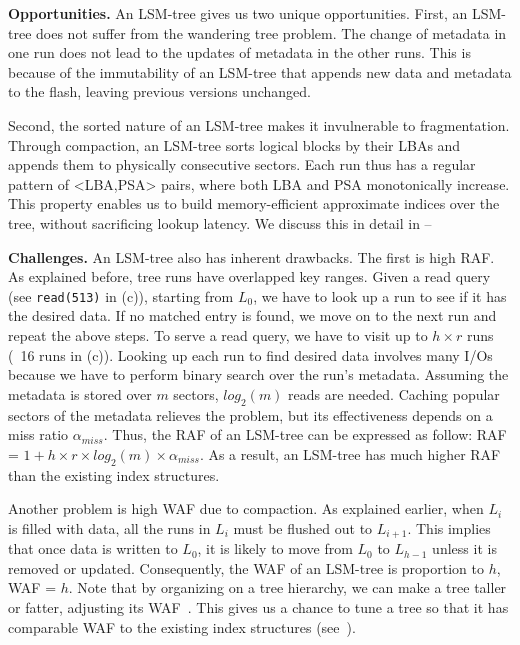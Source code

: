 \textbf{Opportunities.}
An LSM-tree gives us two unique opportunities.
First, an LSM-tree does not suffer from the wandering tree problem.
The change of metadata in one run does not lead 
to the updates of metadata in the other runs.
This is because of the immutability of an LSM-tree that
appends new data and metadata to the flash, 
leaving previous versions unchanged.

Second, the sorted nature of an LSM-tree makes it invulnerable
to fragmentation. Through compaction, an LSM-tree sorts
logical blocks by their LBAs and appends them 
to physically consecutive sectors. 
Each run thus has a regular pattern of <LBA,PSA> pairs,
where both LBA and PSA monotonically increase.
This property enables us to build 
memory-efficient approximate indices over the tree, without
sacrificing lookup latency.
We discuss this in detail in --


\textbf{Challenges.}
An LSM-tree also has inherent drawbacks.  The first is high RAF.  As explained
before, tree runs have overlapped key ranges.  Given a read query (see
\texttt{read(513)} in (c)), starting from $L_0$, we have to look
up a run to see if it has the desired data.  If no matched entry is found, we
move on to the next run and repeat the above steps.  To serve a read query, we
have to visit up to $h \times r$ runs (\eg~16 runs in (c)).
Looking up each run to find desired data involves many I/Os because we have to
perform binary search over the run's metadata.  Assuming the metadata is stored
over $m$ sectors, $log_{2}(m)$ reads are needed.  Caching popular sectors of the
metadata relieves the problem, but its effectiveness depends 
on a miss ratio $\alpha_{miss}$.
Thus, the RAF of an LSM-tree can be expressed as follow: 
RAF = $1 + h \times r
\times log_{2}(m) \times \alpha_{miss}$.
As a result, an LSM-tree has much higher RAF than 
the existing index structures.

Another problem is high WAF due to compaction. As explained earlier, when
$L_{i}$ is filled with data, all the runs in $L_{i}$ must be flushed out to
$L_{i+1}$. This implies that once data is written to $L_0$, it is likely to
move from $L_0$ to $L_{h-1}$ unless it is removed or updated.  Consequently,
the WAF of an LSM-tree is proportion to $h$, WAF = $h$. Note that 
by organizing on a tree hierarchy, we can make a tree taller or fatter,
adjusting its WAF~\cite{monkey}. 
This gives us a chance to tune a tree so that 
it has comparable WAF to the existing index structures
(see~).

